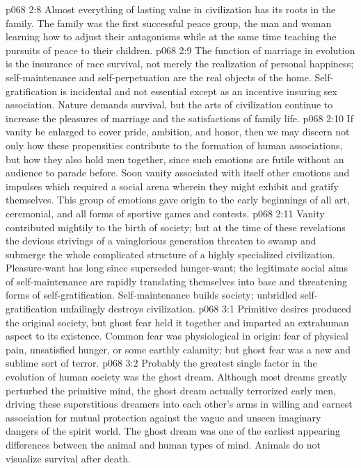 \vs p068 2:8 Almost everything of lasting value in civilization has its roots in the family. The family was the first successful peace group, the man and woman learning how to adjust their antagonisms while at the same time teaching the pursuits of peace to their children.
\vs p068 2:9 The function of marriage in evolution is the insurance of race survival, not merely the realization of personal happiness; self\hyp{}maintenance and self\hyp{}perpetuation are the real objects of the home. Self\hyp{}gratification is incidental and not essential except as an incentive insuring sex association. Nature demands survival, but the arts of civilization continue to increase the pleasures of marriage and the satisfactions of family life.
\vs p068 2:10 \pc If vanity be enlarged to cover pride, ambition, and honor, then we may discern not only how these propensities contribute to the formation of human associations, but how they also hold men together, since such emotions are futile without an audience to parade before. Soon vanity associated with itself other emotions and impulses which required a social arena wherein they might exhibit and gratify themselves. This group of emotions gave origin to the early beginnings of all art, ceremonial, and all forms of sportive games and contests.
\vs p068 2:11 Vanity contributed mightily to the birth of society; but at the time of these revelations the devious strivings of a vainglorious generation threaten to swamp and submerge the whole complicated structure of a highly specialized civilization. Pleasure\hyp{}want has long since superseded hunger\hyp{}want; the legitimate social aims of self\hyp{}maintenance are rapidly translating themselves into base and threatening forms of self\hyp{}gratification. Self\hyp{}maintenance builds society; unbridled self\hyp{}gratification unfailingly destroys civilization.
\vs p068 3:1 Primitive desires produced the original society, but ghost fear held it together and imparted an extrahuman aspect to its existence. Common fear was physiological in origin: fear of physical pain, unsatisfied hunger, or some earthly calamity; but ghost fear was a new and sublime sort of terror.
\vs p068 3:2 Probably the greatest single factor in the evolution of human society was the ghost dream. Although most dreams greatly perturbed the primitive mind, the ghost dream actually terrorized early men, driving these superstitious dreamers into each other’s arms in willing and earnest association for mutual protection against the vague and unseen imaginary dangers of the spirit world. The ghost dream was one of the earliest appearing differences between the animal and human types of mind. Animals do not visualize survival after death.
